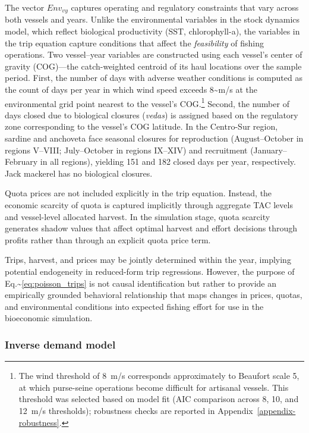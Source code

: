 \documentclass[
  11pt,
]{article}
\begin{document}
The vector \(Env_{vy}\) captures operating and regulatory constraints that vary across both vessels and years. Unlike the environmental variables in the stock dynamics model, which reflect biological productivity (SST, chlorophyll-a), the variables in the trip equation capture conditions that affect the \emph{feasibility} of fishing operations. Two vessel--year variables are constructed using each vessel's center of gravity (COG)---the catch-weighted centroid of its haul locations over the sample period. First, the number of days with adverse weather conditions is computed as the count of days per year in which wind speed exceeds 8\textasciitilde m/s at the environmental grid point nearest to the vessel's COG.\footnote{The wind threshold of 8~m/s corresponds approximately to Beaufort scale 5, at which purse-seine operations become difficult for artisanal vessels. This threshold was selected based on model fit (AIC comparison across 8, 10, and 12~m/s thresholds); robustness checks are reported in Appendix~\ref{appendix-robustness}.} Second, the number of days closed due to biological closures (\textit{vedas}) is assigned based on the regulatory zone corresponding to the vessel's COG latitude. In the Centro-Sur region, sardine and anchoveta face seasonal closures for reproduction (August--October in regions V--VIII; July--October in regions IX--XIV) and recruitment (January--February in all regions), yielding 151 and 182 closed days per year, respectively. Jack mackerel has no biological closures.

Quota prices are not included explicitly in the trip equation. Instead, the economic scarcity of quota is captured implicitly through aggregate TAC levels and vessel-level allocated harvest. In the simulation stage, quota scarcity generates shadow values that affect optimal harvest and effort decisions through profits rather than through an explicit quota price term.

Trips, harvest, and prices may be jointly determined within the year, implying potential endogeneity in reduced-form trip regressions. However, the purpose of Eq.\textasciitilde{}\eqref{eq:poisson_trips} is not causal identification but rather to provide an empirically grounded behavioral relationship that maps changes in prices, quotas, and environmental conditions into expected fishing effort for use in the bioeconomic simulation.

\subsubsection{Inverse demand model}\label{inverse-demand-model}
\end{document}
